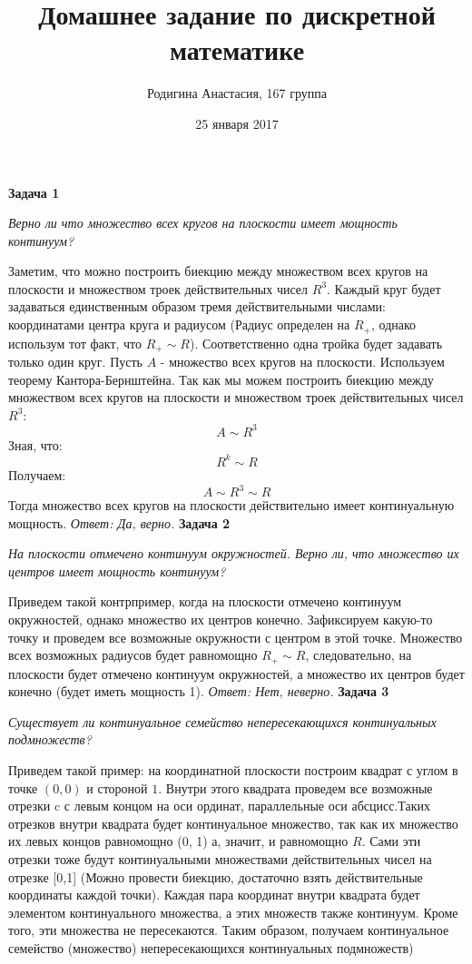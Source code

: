 \documentclass{article}
\title{Домашнее задание по дискретной математике}
\author{Родигина Анастасия, 167 группа}
\date{25 января 2017}
\begin{document}
            

\maketitle  
 \noindent \textbf{Задача 1}
\begin{center} 
\textit{Верно ли что множество всех кругов на плоскости имеет мощность континуум?}
\end{center}
Заметим, что можно построить биекцию между множеством всех кругов на плоскости и множеством троек действительных чисел $R^3$. Каждый круг будет задаваться единственным образом тремя действительными числами: координатами центра круга и радиусом (Радиус определен на $R_+$, однако использум тот факт, что $R_+ \sim R$). Соответственно одна тройка будет задавать только один круг. Пусть $A$ - множество всех кругов на плоскости. Используем теорему Кантора-Бернштейна. Так как мы можем построить биекцию между множеством всех кругов на плоскости и множеством троек действительных чисел $R^3$: $$A \sim R^3$$ 
Зная, что: $$R^k \sim R$$
Получаем: $$A \sim R^3 \sim R$$
Тогда множество всех кругов на плоскости действительно имеет континуальную мощность.
\newline
 \noindent \textit{Ответ: Да, верно.}
\newline
\newline
\textbf{Задача 2}
\begin{center}
\textit{На плоскости отмечено континуум окружностей. Верно ли, что множество их центров имеет мощность континуум?}
\end{center}
Приведем такой контрпример, когда на плоскости отмечено континуум окружностей, однако множество их центров конечно. 
Зафиксируем какую-то точку и проведем все возможные окружности с центром в этой точке. Множество всех возможных радиусов будет равномощно $R_+ \sim R$, следовательно, на плоскости будет отмечено континуум окружностей, а множество их центров будет конечно (будет иметь мощность 1).
\newline
 \noindent \textit{Ответ: Нет, неверно.} 
 \newline
 \newline
 \newline
 \newline
\textbf{Задача 3}
\begin{center}
\textit{Существует ли континуальное семейство непересекающихся континуальных подмножеств?} 
\end{center}
Приведем такой пример: на координатной плоскости построим квадрат с углом в точке $(0,0)$ и стороной $1$. Внутри этого квадрата проведем все возможные отрезки c с левым концом на оси ординат, параллельные оси абсцисс.Таких отрезков внутри квадрата будет континуальное множество, так как их множество их левых концов равномощно (0, 1) а, значит, и равномощно $R$. Сами эти отрезки тоже будут континуальными множествами действительных чисел на отрезке [0,1] (Можно провести биекцию, достаточно взять действительные координаты каждой точки). Каждая пара координат внутри квадрата будет элементом континуального множества, а этих множеств также континуум. Кроме того, эти множества не пересекаются. Таким образом, получаем континуальное семейство (множество) непересекающихся континуальных подмножеств)
\end{document}
